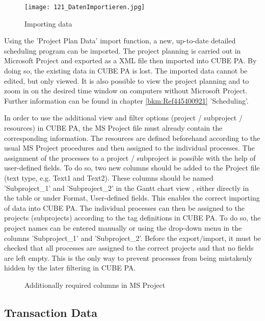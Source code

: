 \begin{figure}
\vspace{-15pt}
\texttt{[image: 121\_DatenImportieren.jpg]}
\caption{Importing data}
\end{figure}
Using the 'Project Plan Data' import function, a new, up-to-date detailed scheduling program can be imported. The project planning is carried out in Microsoft Project and exported as a XML file then imported into CUBE PA. By doing so, the existing data in CUBE PA is lost. The imported data cannot be edited, but only viewed. It is also possible to view the project planning and to zoom in on the desired time window on computers without Microsoft Project. Further information can be found in chapter \ref{bkm:Ref445400921} 'Scheduling'.

\vspace{\baselineskip}

In order to use the additional view and filter options (project / subproject / resources) in CUBE PA, the MS Project file must already contain the corresponding information. The resources are defined beforehand according to the usual MS Project procedures and then assigned to the individual processes. The assignment of the processes to a project / subproject is possible with the help of user-defined fields. To do so, two new columns should be added to the Project file (text type, e.g. Text1 and Text2). These columns should be named 'Subproject\_1' and 'Subproject\_2' in the Gantt chart view , either directly in the table or under Format, User-defined fields. This enables the correct importing of data into CUBE PA. The individual processes can then be assigned to the projects (subprojects) according to the tag definitions in CUBE PA. To do so, the project names can be entered manually or using the drop-down menu in the columns 'Subproject\_1' and 'Subproject\_2'. Before the export/import, it must be checked that all processes are assigned to the correct projects and that no fields are left empty. This is the only way to prevent processes from being mistakenly hidden by the later filtering in CUBE PA.

\begin{figure}[H]
\caption{Additionally required columns in MS Project}
\end{figure}

\subsection{Transaction Data}

